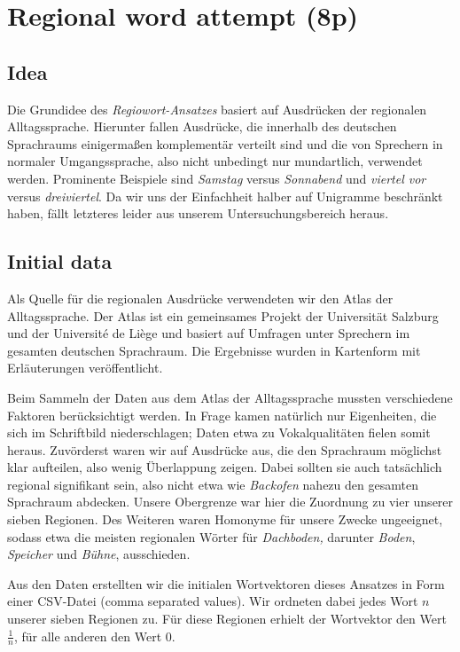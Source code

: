 \documentclass[../Main.tex]{subfiles}
\begin{document}
\section{Regional word attempt (8p)}
\subsection{Idea}
Die Grundidee des \textit{Regiowort-Ansatzes} basiert auf Ausdrücken der regionalen Alltagssprache. Hierunter fallen Ausdrücke, die innerhalb des deutschen Sprachraums einigermaßen komplementär verteilt sind und die von Sprechern in normaler Umgangssprache, also nicht unbedingt nur mundartlich, verwendet werden. Prominente Beispiele sind \textit{Samstag} versus \textit{Sonnabend} und \textit{viertel vor} versus \textit{dreiviertel}. Da wir uns der Einfachheit halber auf Unigramme beschränkt haben, fällt letzteres leider aus unserem Untersuchungsbereich heraus.

\subsection{Initial data}
Als Quelle für die regionalen Ausdrücke verwendeten wir den Atlas der Alltagssprache. Der Atlas ist ein gemeinsames Projekt der Universität Salzburg und der Université de Liège und basiert auf Umfragen unter Sprechern im gesamten deutschen Sprachraum. Die Ergebnisse wurden in Kartenform mit Erläuterungen veröffentlicht.

Beim Sammeln der Daten aus dem Atlas der Alltagssprache mussten verschiedene Faktoren berücksichtigt werden. In Frage kamen natürlich nur Eigenheiten, die sich im Schriftbild niederschlagen; Daten etwa zu Vokalqualitäten fielen somit heraus. Zuvörderst waren wir auf Ausdrücke aus, die den Sprachraum möglichst klar aufteilen, also wenig Überlappung zeigen. Dabei sollten sie auch tatsächlich regional signifikant sein, also nicht etwa wie \textit{Backofen} nahezu den gesamten Sprachraum abdecken. Unsere Obergrenze war hier die Zuordnung zu vier unserer sieben Regionen. Des Weiteren waren Homonyme für unsere Zwecke ungeeignet, sodass etwa die meisten regionalen Wörter für \textit{Dachboden,} darunter \textit{Boden}, \textit{Speicher} und \textit{Bühne}, ausschieden.

Aus den Daten erstellten wir die initialen Wortvektoren dieses Ansatzes in Form einer CSV-Datei (comma separated values). Wir ordneten dabei jedes Wort $n$ unserer sieben Regionen zu. Für diese Regionen erhielt der Wortvektor den Wert $\frac 1 n$, für alle anderen den Wert 0.
\end{document}
